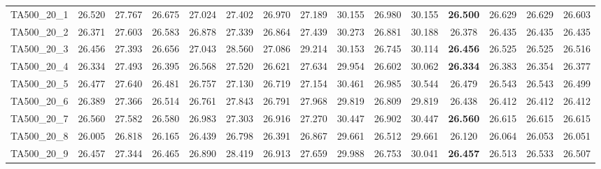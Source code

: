 \begin{tabular}{cc||ccccccccccccc}
TA500\_20\_1       & 26.520           & 27.767           & 26.675           & 27.024           & 27.402           & 26.970           & 27.189           & 30.155           & 26.980           & 30.155           & {\bf 26.500}     & 26.629           & 26.629           & 26.603          \\ 
TA500\_20\_2       & 26.371           & 27.603           & 26.583           & 26.878           & 27.339           & 26.864           & 27.439           & 30.273           & 26.881           & 30.188           & 26.378           & 26.435           & 26.435           & 26.435          \\ 
TA500\_20\_3       & 26.456           & 27.393           & 26.656           & 27.043           & 28.560           & 27.086           & 29.214           & 30.153           & 26.745           & 30.114           & {\bf 26.456}     & 26.525           & 26.525           & 26.516          \\ 
TA500\_20\_4       & 26.334           & 27.493           & 26.395           & 26.568           & 27.520           & 26.621           & 27.634           & 29.954           & 26.602           & 30.062           & {\bf 26.334}     & 26.383           & 26.354           & 26.377          \\ 
TA500\_20\_5       & 26.477           & 27.640           & 26.481           & 26.757           & 27.130           & 26.719           & 27.154           & 30.461           & 26.985           & 30.544           & 26.479           & 26.543           & 26.543           & 26.499          \\ 
TA500\_20\_6       & 26.389           & 27.366           & 26.514           & 26.761           & 27.843           & 26.791           & 27.968           & 29.819           & 26.809           & 29.819           & 26.438           & 26.412           & 26.412           & 26.412          \\ 
TA500\_20\_7       & 26.560           & 27.582           & 26.580           & 26.983           & 27.303           & 26.916           & 27.270           & 30.447           & 26.902           & 30.447           & {\bf 26.560}     & 26.615           & 26.615           & 26.615          \\ 
TA500\_20\_8       & 26.005           & 26.818           & 26.165           & 26.439           & 26.798           & 26.391           & 26.867           & 29.661           & 26.512           & 29.661           & 26.120           & 26.064           & 26.053           & 26.051          \\ 
TA500\_20\_9       & 26.457           & 27.344           & 26.465           & 26.890           & 28.419           & 26.913           & 27.659           & 29.988           & 26.753           & 30.041           & {\bf 26.457}     & 26.513           & 26.533           & 26.507          \\ 
\end{tabular}